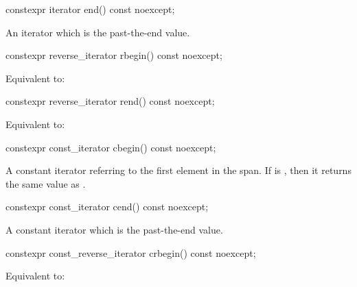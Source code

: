 \begin{codeblock}
\begin{codeblock}
\begin{codeblock}
%
\begin{itemdecl}
constexpr iterator end() const noexcept;
\end{itemdecl}
\begin{itemdescr}
\pnum
\returns
An iterator which is the past-the-end value.
\end{itemdescr}

%
\begin{itemdecl}
constexpr reverse_iterator rbegin() const noexcept;
\end{itemdecl}
\begin{itemdescr}
\pnum
\effects
Equivalent to: 
\end{itemdescr}

%
\begin{itemdecl}
constexpr reverse_iterator rend() const noexcept;
\end{itemdecl}
\begin{itemdescr}
\pnum
\returns
Equivalent to: 
\end{itemdescr}

%
\begin{itemdecl}
constexpr const_iterator cbegin() const noexcept;
\end{itemdecl}
\begin{itemdescr}
\pnum
\returns
A constant iterator referring to the first element in the span.
If  is , then it returns the same value
as .
\end{itemdescr}

%
\begin{itemdecl}
constexpr const_iterator cend() const noexcept;
\end{itemdecl}
\begin{itemdescr}
\pnum
\returns
A constant iterator which is the past-the-end value.
\end{itemdescr}

%
\begin{itemdecl}
constexpr const_reverse_iterator crbegin() const noexcept;
\end{itemdecl}
\begin{itemdescr}
\pnum
\effects
Equivalent to: 
\end{itemdescr}


\end{codeblock}
\end{codeblock}
\end{codeblock}
